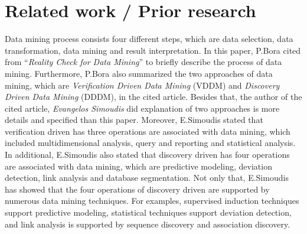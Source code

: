 \documentclass[a4paper,12pt]{article}
\begin{document}
\section{Related work / Prior research}
\hspace{1cm}Data mining process consists four different steps, which are data selection, data transformation, data mining and result interpretation. In this paper, P.Bora cited from “\textit{Reality Check for Data Mining}” to briefly describe the process of data mining. Furthermore, P.Bora also summarized the two approaches of data mining, which are \textit{Verification Driven Data Mining} (VDDM) and \textit{Discovery Driven Data Mining} (DDDM), in the cited article. Besides that, the author of the cited article, \textit{Evangelos Simoudis} did explanation of two approaches is more details and specified than this paper. Moreover, E.Simoudis stated that verification driven has three operations are associated with data mining, which included multidimensional analysis, query and reporting and statistical analysis. In additional, E.Simoudis also stated that discovery driven has four operations are associated with data mining, which are predictive modeling, deviation detection, link analysis and database segmentation. Not only that, E.Simoudis has showed that the four operations of discovery driven are supported by numerous data mining techniques. For examples, supervised induction techniques support predictive modeling, statistical techniques support deviation detection, and link analysis is supported by sequence discovery and association discovery. ~\cite{SimoudisE1996}
\\ \\ \\ \\ \\ \\ \\ \\
\end{document}
